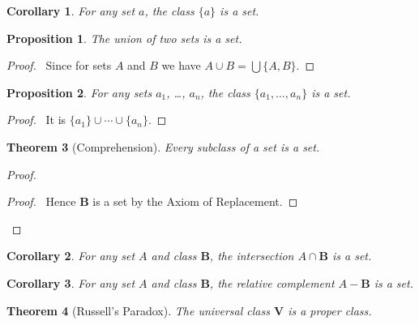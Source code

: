 \documentclass{book}
\let\qed\relax
\newtheorem{prop}{Proposition}[chapter]
\newtheorem{thm}[prop]{Theorem}
\newtheorem{cor}{Corollary}[prop]
\theoremstyle{definition}
\begin{document}
\begin{cor}
    For any set $a$, the class $\{a\}$ is a set.
\end{cor}
    
\begin{prop}
    The union of two sets is a set.
\end{prop}

\begin{proof}
    \pf\ Since for sets $A$ and $B$ we have $A \cup B = \bigcup \{A,B\}$. \qed
\end{proof}

\begin{prop}
    For any sets $a_1$, \ldots, $a_n$, the class $\{ a_1, \ldots, a_n \}$ is a set.
\end{prop}

\begin{proof}
    \pf\ It is $\{ a_1 \} \cup \cdots \cup \{ a_n \}$. \qed
\end{proof}

\begin{thm}[Comprehension]
    Every subclass of a set is a set.
\end{thm}

\begin{proof}
    \pf
    \qedstep
    \begin{proof}
        \pf\ Hence $\mathbf{B}$ is a set by the Axiom of Replacement.
    \end{proof}
    \qed
\end{proof}

\begin{cor}
    For any set $A$ and class $\mathbf{B}$, the intersection $A \cap \mathbf{B}$ is a set.
\end{cor}

\begin{cor}
    For any set $A$ and class $\mathbf{B}$, the relative complement $A - \mathbf{B}$ is a set.
\end{cor}

\begin{thm}[Russell's Paradox]
    The universal class $\mathbf{V}$ is a proper class.
\end{thm}
\end{document}
